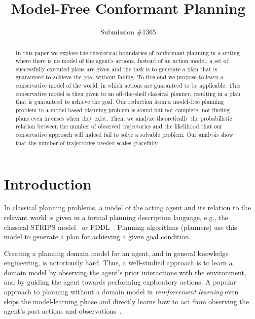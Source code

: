 \documentclass{article}
\title{Model-Free Conformant Planning}
\author{Submission \#1365}
\newcommand{\roni}[1]{[[Roni:#1]]}
\begin{document}
	
	\maketitle
	
	\begin{abstract}
		In this paper we explore the theoretical boundaries of 
		conformant planning in a setting where 
		there is no model of the agent's actions. 
		Instead of an action model, a set of successfully executed plans are given and the task is to generate a plan that is guaranteed to achieve the goal without failing. 
		To this end we propose to learn a conservative model of the world, in which actions are guaranteed to be applicable. This conservative model is then given to an off-the-shelf classical planner, resulting in a plan that is guaranteed to achieve the goal. 
		Our reduction from a model-free planning problem to a model-based planning problem is sound but not complete, not finding plans even in cases when they exist. 
		Then, we analyze theoretically the probabilistic relation between the number of observed trajectories and the likelihood that our conservative approach will indeed fail to solve a solvable problem. Our analysis show that the number of trajectories needed scales gracefully.
	\end{abstract}
	
	\section{Introduction}
	In classical planning problems, a model of the acting agent and its relation to the relevant world is given in a formal planning description language, e.g., the classical STRIPS model~\cite{fikes1971strips} or PDDL~\cite{mcdermott1998pddl}. Planning algorithms (planners) use this model to generate a plan for achieving a given goal condition. 
	
	Creating a planning domain model for an agent, and in general knowledge engineering, is notoriously hard. %
	Thus, a well-studied approach is to learn a domain model by observing the agent's prior interactions with the environment, and by guiding the agent towards performing exploratory actions. A popular approach to planning without a domain model in {\em reinforcement learning} even skips the model-learning phase and directly learns how to act from observing the agent's past actions and observations~\cite[e.g.]{kearns2002}.  
	
\end{document}
